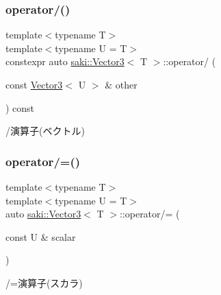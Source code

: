 \subsubsection{\texorpdfstring{operator/()}{operator/()}\hspace{0.1cm}{\footnotesize\ttfamily [2/2]}}
{\footnotesize\ttfamily template$<$typename T$>$ \\
template$<$typename U  = T$>$ \\
constexpr auto \mbox{\hyperlink{classsaki_1_1_vector3}{saki\+::\+Vector3}}$<$ T $>$\+::operator/ (\begin{DoxyParamCaption}\item[{const \mbox{\hyperlink{classsaki_1_1_vector3}{Vector3}}$<$ U $>$ \&}]{other }\end{DoxyParamCaption}) const\hspace{0.3cm}{\ttfamily [inline]}}



/演算子(ベクトル) 

\mbox{\label{classsaki_1_1_vector3_aacf8494aa9c503f70bad8039e1f926b9}} 
\subsubsection{\texorpdfstring{operator/=()}{operator/=()}\hspace{0.1cm}{\footnotesize\ttfamily [1/2]}}
{\footnotesize\ttfamily template$<$typename T$>$ \\
template$<$typename U  = T$>$ \\
auto \mbox{\hyperlink{classsaki_1_1_vector3}{saki\+::\+Vector3}}$<$ T $>$\+::operator/= (\begin{DoxyParamCaption}\item[{const U \&}]{scalar }\end{DoxyParamCaption})\hspace{0.3cm}{\ttfamily [inline]}}



/=演算子(スカラ) 

\mbox{\label{classsaki_1_1_vector3_a65eeb9e82784752ccde12b72a33da67e}} 
